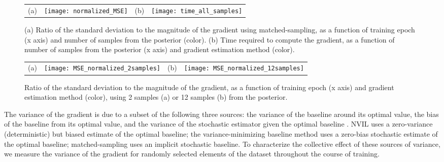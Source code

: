 \documentclass{article} %
\begin{document}
\begin{figure}[tb]
  \begin{center}
    \begin{tabular}{p{0.0in}p{2.25in}p{0.0in}p{2.25in}}
      \parbox[b]{0in}{(a) \vspace{3.5cm}} & \texttt{[image: normalized\_MSE]} & 
      \parbox[b]{0in}{(b) \vspace{3.5cm}} & \texttt{[image: time\_all\_samples]}  %
    \end{tabular}
  \end{center}
  \caption{(a) Ratio of the standard deviation to the magnitude of the gradient using matched-sampling, as a function of training epoch (x axis) and number of samples from the posterior (color).  (b) Time required to compute the gradient, as a function of number of samples from the posterior (x axis) and gradient estimation method (color).   \label{ms_learning_and_cpu_time}} 
\end{figure}

\begin{figure}[tb]
  \begin{center}
    \begin{tabular}{p{0.0in}p{2.25in}p{0.0in}p{2.25in}}
      \parbox[b]{0in}{(a) \vspace{3.5cm}} & \texttt{[image: MSE\_normalized\_2samples]} & 
      \parbox[b]{0in}{(b) \vspace{3.5cm}} & \texttt{[image: MSE\_normalized\_12samples]}  %
    \end{tabular}
  \end{center}
  \caption{Ratio of the standard deviation to the magnitude of the gradient, as a function of training epoch (x axis) and gradient estimation method (color), using 2 samples (a) or 12 samples (b) from the posterior.  \label{learning_fixed_samples}} 
\end{figure}


The variance of the gradient is due to a subset of the following three sources: the variance of the baseline around its optimal value, the bias of the baseline from its optimal value, and the variance of the stochastic estimator given the optimal baseline \cite{greensmith2004variance}.  NVIL uses a zero-variance (deterministic) but biased estimate of the optimal baseline; the variance-minimizing baseline method uses a zero-bias stochastic estimate of the optimal baseline; matched-sampling uses an implicit stochastic baseline.  To characterize the collective effect of these sources of variance, %
we measure the variance of the gradient for randomly selected elements of the dataset throughout the course of training.  
\end{document}
